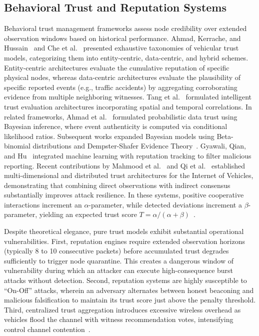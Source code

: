\documentclass[conference]{IEEEtran}
\begin{document}
\subsection{Behavioral Trust and Reputation Systems}

Behavioral trust management frameworks assess node credibility over extended observation windows based on historical performance. Ahmad, Kerrache, and Hussain~\cite{trustsurvey} and Che et al.~\cite{che2022trust} presented exhaustive taxonomies of vehicular trust models, categorizing them into entity-centric, data-centric, and hybrid schemes. Entity-centric architectures evaluate the cumulative reputation of specific physical nodes, whereas data-centric architectures evaluate the plausibility of specific reported events (e.g., traffic accidents) by aggregating corroborating evidence from multiple neighboring witnesses. Tang et al.~\cite{chen2011trust} formulated intelligent trust evaluation architectures incorporating spatial and temporal correlations. In related frameworks, Ahmad et al.~\cite{ahmad2019trust} formulated probabilistic data trust using Bayesian inference, where event authenticity is computed via conditional likelihood ratios. Subsequent works expanded Bayesian models using Beta-binomial distributions and Dempster-Shafer Evidence Theory~\cite{ahmad2019trust}. Gyawali, Qian, and Hu~\cite{gyawali2020} integrated machine learning with reputation tracking to filter malicious reporting. Recent contributions by Mahmood et al.~\cite{mahmood2023distributed} and Qi et al.~\cite{qi2023multidimensional} established multi-dimensional and distributed trust architectures for the Internet of Vehicles, demonstrating that combining direct observations with indirect consensus substantially improves attack resilience. In these systems, positive cooperative interactions increment an $\alpha$-parameter, while detected deviations increment a $\beta$-parameter, yielding an expected trust score $T = \alpha / (\alpha + \beta)$~\cite{ahmad2019trust}.

Despite theoretical elegance, pure trust models exhibit substantial operational vulnerabilities. First, reputation engines require extended observation horizons (typically 8 to 10 consecutive packets) before accumulated trust degrades sufficiently to trigger node quarantine. This creates a dangerous window of vulnerability during which an attacker can execute high-consequence burst attacks without detection. Second, reputation systems are highly susceptible to ``On-Off'' attacks, wherein an adversary alternates between honest beaconing and malicious falsification to maintain its trust score just above the penalty threshold. Third, centralized trust aggregation introduces excessive wireless overhead as vehicles flood the channel with witness recommendation votes, intensifying control channel contention~\cite{che2022trust, mahmood2023distributed}.
\end{document}
